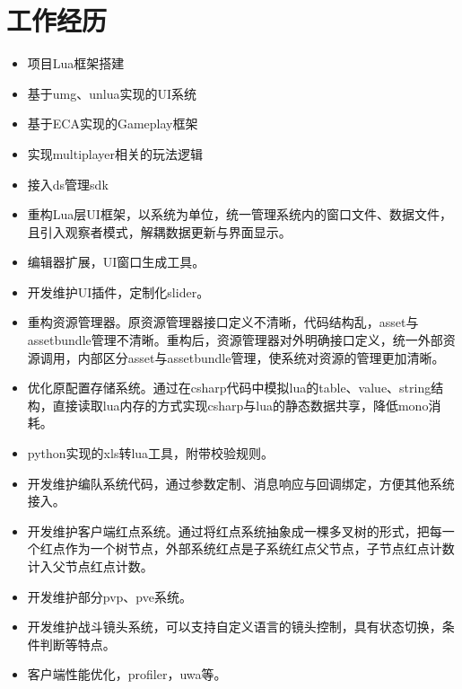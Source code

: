 \documentclass{resume}
\begin{document}
\section{工作经历}
\begin{itemize}
  \item 项目Lua框架搭建
  \item 基于umg、unlua实现的UI系统
  \item 基于ECA实现的Gameplay框架
  \item 实现multiplayer相关的玩法逻辑
  \item 接入ds管理sdk
\end{itemize}
\begin{itemize}
  \item 重构Lua层UI框架，以系统为单位，统一管理系统内的窗口文件、数据文件，且引入观察者模式，解耦数据更新与界面显示。
  \item 编辑器扩展，UI窗口生成工具。
  \item 开发维护UI插件，定制化slider。
  \item 重构资源管理器。原资源管理器接口定义不清晰，代码结构乱，asset与assetbundle管理不清晰。重构后，资源管理器对外明确接口定义，统一外部资源调用，内部区分asset与assetbundle管理，使系统对资源的管理更加清晰。
  \item 优化原配置存储系统。通过在csharp代码中模拟lua的table、value、string结构，直接读取lua内存的方式实现csharp与lua的静态数据共享，降低mono消耗。
  \item python实现的xls转lua工具，附带校验规则。
  \item 开发维护编队系统代码，通过参数定制、消息响应与回调绑定，方便其他系统接入。
  \item 开发维护客户端红点系统。通过将红点系统抽象成一棵多叉树的形式，把每一个红点作为一个树节点，外部系统红点是子系统红点父节点，子节点红点计数计入父节点红点计数。
  \item 开发维护部分pvp、pve系统。
  \item 开发维护战斗镜头系统，可以支持自定义语言的镜头控制，具有状态切换，条件判断等特点。
  \item 客户端性能优化，profiler，uwa等。
\end{itemize}


%
%
\end{document}
